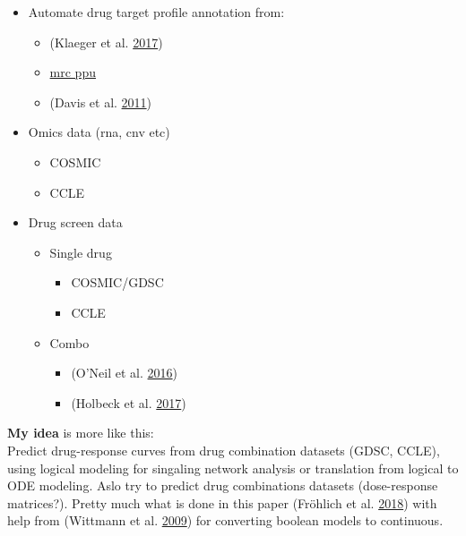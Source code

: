 \documentclass[12pt,]{book}
\providecommand{\tightlist}{%
  \setlength{\itemsep}{0pt}\setlength{\parskip}{0pt}}
\begin{document}
\begin{itemize}
\tightlist
\item
  Automate drug target profile annotation from:

  \begin{itemize}
  \tightlist
  \item
    (Klaeger et al. \protect\hyperlink{ref-Klaeger2017}{2017})
  \item
    \href{http://www.kinase-screen.mrc.ac.uk/}{mrc ppu}
  \item
    (Davis et al. \protect\hyperlink{ref-Davis2011}{2011})
  \end{itemize}
\item
  Omics data (rna, cnv etc)

  \begin{itemize}
  \tightlist
  \item
    COSMIC
  \item
    CCLE
  \end{itemize}
\item
  Drug screen data

  \begin{itemize}
  \tightlist
  \item
    Single drug

    \begin{itemize}
    \tightlist
    \item
      COSMIC/GDSC
    \item
      CCLE
    \end{itemize}
  \item
    Combo

    \begin{itemize}
    \tightlist
    \item
      (O'Neil et al. \protect\hyperlink{ref-ONeil2016}{2016})
    \item
      (Holbeck et al. \protect\hyperlink{ref-Holbeck2017}{2017})
    \end{itemize}
  \end{itemize}
\end{itemize}

\textbf{My idea} is more like this:\\
Predict drug-response curves from drug combination datasets (GDSC, CCLE),
using logical modeling for singaling network analysis or translation from
logical to ODE modeling. Aslo try to predict drug combinations datasets
(dose-response matrices?). Pretty much what is done in this paper (Fröhlich et al. \protect\hyperlink{ref-Frohlich2018}{2018})
with help from (Wittmann et al. \protect\hyperlink{ref-Wittmann2009}{2009}) for converting boolean models to continuous.
\end{document}

